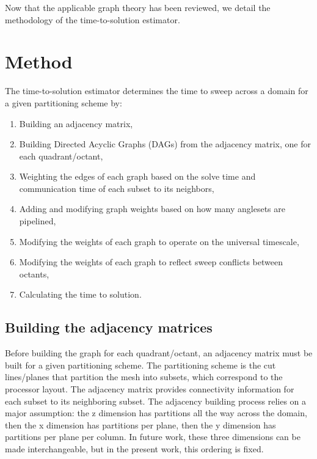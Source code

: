 
Now that the applicable graph theory has been reviewed, we detail the methodology of the time-to-solution estimator.

\section{Method}
The time-to-solution estimator determines the time to sweep across a domain for a given partitioning scheme by:
\begin{enumerate}
	\item Building an adjacency matrix,
	\item Building Directed Acyclic Graphs (DAGs) from the adjacency matrix, one for each quadrant/octant,
	\item Weighting the edges of each graph based on the solve time and communication time of each subset to its neighbors,
     \item Adding and modifying graph weights based on how many anglesets are pipelined,
	\item Modifying the weights of each graph to operate on the universal timescale,
	\item Modifying the weights of each graph to reflect sweep conflicts between octants,
	\item Calculating the time to solution.
\end{enumerate}

\subsection{Building the adjacency matrices}

Before building the graph for each quadrant/octant, an adjacency matrix must be built for a given partitioning scheme. The partitioning scheme is the cut lines/planes that partition the mesh into subsets, which correspond to the processor layout.
The adjacency matrix provides connectivity information for each subset to its neighboring subset.
The adjacency building process relies on a major assumption: the z dimension has partitions all the way across the domain, then the x dimension has partitions per plane, then the y dimension has partitions per plane per column.
In future work, these three dimensions can be made interchangeable, but in the present work, this ordering is fixed.

